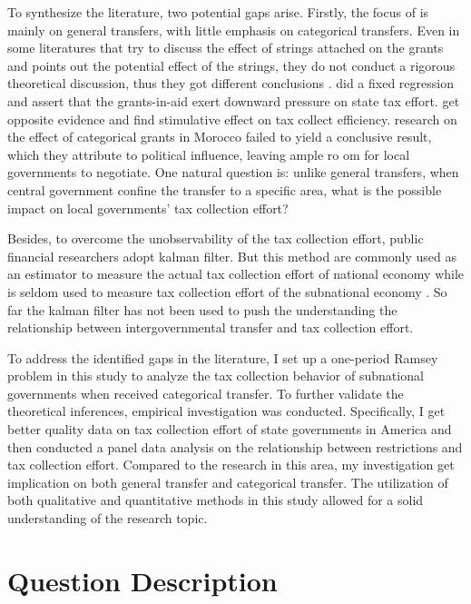 \documentclass[man]{apa7}
\begin{document}
To synthesize the literature, two potential gaps arise. Firstly, the focus of is mainly on general transfers, with little emphasis on categorical transfers.  Even in some literatures that try to discuss the effect of strings attached on the grants and points out the potential effect of the strings, they do not conduct a rigorous theoretical discussion, thus they got different conclusions \parencite{gramlich1997intergovernmental,chubb1985political,nicholson2004goal}. \textcite{nicholson2008fiscal} did a fixed regression and assert that the grants-in-aid exert downward pressure on state tax effort. \textcite{dash2013intergovernmental}get opposite evidence and find stimulative effect on tax collect efficiency. \textcite{2016The} research on the effect of categorical grants in Morocco failed to yield a conclusive result, which they attribute to political influence, leaving ample ro om for local governments to negotiate. One natural question is: unlike general transfers, when central government confine the transfer to a specific area, what is the possible impact on local governments' tax collection effort?

Besides, to overcome the unobservability of the tax collection effort, public financial researchers adopt kalman filter. But this method are commonly used as an estimator to measure the actual tax collection effort of national economy while is seldom used to measure tax collection effort of the subnational economy \parencite{W2007Measuring}. So far the kalman filter has not been used to push the understanding the relationship between intergovernmental transfer and tax collection effort.

To address the identified gaps in the literature, I set up a one-period Ramsey problem in this study to analyze the tax collection behavior of subnational governments when received categorical transfer.  To further validate the theoretical inferences, empirical investigation was conducted. Specifically, I get better quality data on tax collection effort of state governments in America and then conducted a panel data analysis on the relationship between  restrictions and tax collection effort. Compared to the research in this area, my investigation get implication on both general transfer and categorical transfer. The utilization of both qualitative and quantitative methods in this study allowed for a solid understanding of the research topic.


\section{Question Description}
\end{document}
